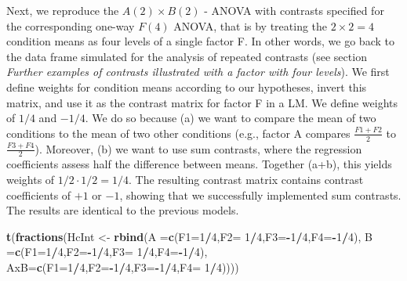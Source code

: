 \documentclass[12pt,]{krantz}
\newenvironment{Shaded}{\begin{snugshade}}{\end{snugshade}}
\newcommand{\DataTypeTok}[1]{\textcolor[rgb]{0.13,0.29,0.53}{#1}}
\newcommand{\DecValTok}[1]{\textcolor[rgb]{0.00,0.00,0.81}{#1}}
\newcommand{\KeywordTok}[1]{\textcolor[rgb]{0.13,0.29,0.53}{\textbf{#1}}}
\newcommand{\NormalTok}[1]{#1}
\newcommand{\OperatorTok}[1]{\textcolor[rgb]{0.81,0.36,0.00}{\textbf{#1}}}
\newcommand{\StringTok}[1]{\textcolor[rgb]{0.31,0.60,0.02}{#1}}
\theoremstyle{definition}
\theoremstyle{definition}
\theoremstyle{definition}
\theoremstyle{remark}
\begin{document}
Next, we reproduce the \(A(2) \times B(2)\) - ANOVA with contrasts specified for the corresponding one-way \(F(4)\) ANOVA, that is by treating the \(2 \times 2 = 4\) condition means as four levels of a single factor F. In other words, we go back to the data frame simulated for the analysis of repeated contrasts (see section \emph{Further examples of contrasts illustrated with a factor with four levels}). We first define weights for condition means according to our hypotheses, invert this matrix, and use it as the contrast matrix for factor F in a LM. We define weights of \(1/4\) and \(-1/4\). We do so because (a) we want to compare the mean of two conditions to the mean of two other conditions (e.g., factor A compares \(\frac{F1 + F2}{2}\) to \(\frac{F3 + F4}{2}\)). Moreover, (b) we want to use sum contrasts, where the regression coefficients assess half the difference between means. Together (a+b), this yields weights of \(1/2 \cdot 1/2 = 1/4\). The resulting contrast matrix contains contrast coefficients of \(+1\) or \(-1\), showing that we successfully implemented sum contrasts. The results are identical to the previous models.

\begin{Shaded}
\begin{Highlighting}[]
\KeywordTok{t}\NormalTok{(}\KeywordTok{fractions}\NormalTok{(HcInt <-}\StringTok{ }\KeywordTok{rbind}\NormalTok{(}\DataTypeTok{A  =}\KeywordTok{c}\NormalTok{(}\DataTypeTok{F1=}\DecValTok{1}\OperatorTok{/}\DecValTok{4}\NormalTok{,}\DataTypeTok{F2=} \DecValTok{1}\OperatorTok{/}\DecValTok{4}\NormalTok{,}\DataTypeTok{F3=}\OperatorTok{-}\DecValTok{1}\OperatorTok{/}\DecValTok{4}\NormalTok{,}\DataTypeTok{F4=}\OperatorTok{-}\DecValTok{1}\OperatorTok{/}\DecValTok{4}\NormalTok{),}
                           \DataTypeTok{B  =}\KeywordTok{c}\NormalTok{(}\DataTypeTok{F1=}\DecValTok{1}\OperatorTok{/}\DecValTok{4}\NormalTok{,}\DataTypeTok{F2=}\OperatorTok{-}\DecValTok{1}\OperatorTok{/}\DecValTok{4}\NormalTok{,}\DataTypeTok{F3=} \DecValTok{1}\OperatorTok{/}\DecValTok{4}\NormalTok{,}\DataTypeTok{F4=}\OperatorTok{-}\DecValTok{1}\OperatorTok{/}\DecValTok{4}\NormalTok{),}
                           \DataTypeTok{AxB=}\KeywordTok{c}\NormalTok{(}\DataTypeTok{F1=}\DecValTok{1}\OperatorTok{/}\DecValTok{4}\NormalTok{,}\DataTypeTok{F2=}\OperatorTok{-}\DecValTok{1}\OperatorTok{/}\DecValTok{4}\NormalTok{,}\DataTypeTok{F3=}\OperatorTok{-}\DecValTok{1}\OperatorTok{/}\DecValTok{4}\NormalTok{,}\DataTypeTok{F4=} \DecValTok{1}\OperatorTok{/}\DecValTok{4}\NormalTok{))))}
\end{Highlighting}
\end{Shaded}
\end{document}
